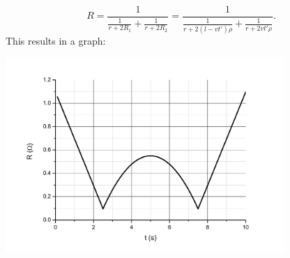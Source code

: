 {\[
R=\frac{1}{\frac{1}{r+2R_1}+\frac{1}{r+2R_2}}=\frac{1}{\frac{1}{r+2(l-vt')\rho}+\frac{1}{r+2vt'\rho}}.
\] 
This results in a graph:
\begin{center}
\includegraphics[width=300pt]{2012-v2g-08-rong_graafik}
\end{center}
\fi
}